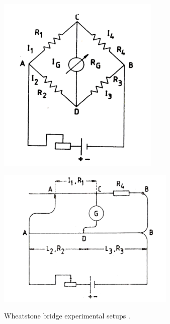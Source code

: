\documentclass[journal]{IEEEtran}
\begin{document}
\begin{figure}[H]
    \centering
    \begin{minipage}{0.45\columnwidth}
        \centering
        \includegraphics[width=\textwidth]{IMAGES/known_resistors_diagram.png} %
        \label{fig:known_diagram}
    \end{minipage}
    \hfill
    \begin{minipage}{0.45\columnwidth}
        \centering
        \includegraphics[width=\textwidth]{IMAGES/unknown_resistor_diagram.png} %
        \label{fig:unknown_diagram}
    \end{minipage}
    \caption{Wheatstone bridge experimental setups \cite{lab_manual}.}
    \label{fig:combined_diagram}
\end{figure}
\end{document}
